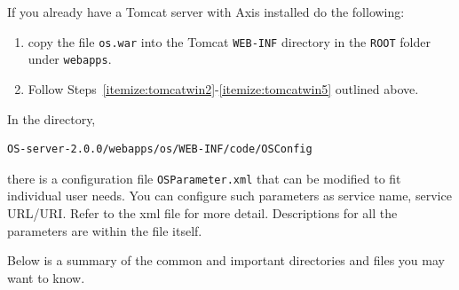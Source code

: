 \documentclass[11pt]{article}
\renewcommand{\_}{{\char"5F}}
\renewcommand{\{}{{\char"7B}}
\renewcommand{\}}{{\char"7D}}
\renewcommand{\^}{{\char"0D}}
\renewcommand{\'}{{\char"0D}}
\begin{document}
\begin{enumerate}[Step 1:]
\vskip 8pt

If you already have a Tomcat server with Axis installed do the following:
\begin{enumerate}
\item{} copy the file {\tt os.war} into the Tomcat {\tt WEB-INF} directory in the {\tt ROOT} folder under {\tt webapps}.

\item{}  Follow Steps~\ref{itemize:tomcatwin2}-\ref{itemize:tomcatwin5} outlined above.
\end{enumerate}

In the directory,
\begin{verbatim}
OS-server-2.0.0/webapps/os/WEB-INF/code/OSConfig
\end{verbatim}
there is a configuration file {\tt OSParameter.xml} that can be modified to fit individual user needs. You can configure such parameters as service name, service URL/URI. Refer to the xml file for more detail. Descriptions for all the parameters are within the file itself.

\vskip 8pt

Below is a summary of the common and important directories and files you may want to know.


\end{enumerate}
\end{document}
